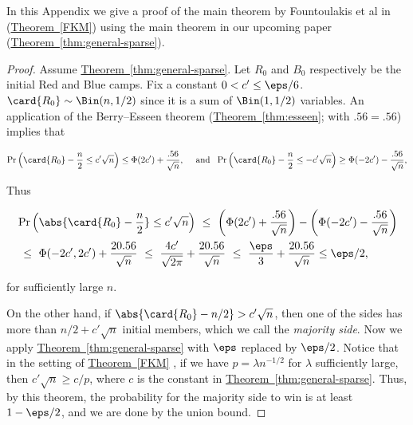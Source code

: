 \documentclass[11pt]{article}
\numberwithin{equation}{section}
\theoremstyle{definition}
\theoremstyle{plain}
\newcommand{\expref}[2]{\hyperref[#2]{#1~\ref{#2}}}
\begin{document}
			
			
			
			In this Appendix we   %
			give a proof of the main theorem by Fountoulakis et al in \cite{fountoulakis} (\expref{Theorem}{FKM}) using the main theorem in our upcoming paper (\expref{Theorem}{thm:general-sparse}).
			
			\begin{proof}
				Assume \expref{Theorem}{thm:general-sparse}. Let $R_0$ and $B_0$ respectively be the initial Red and Blue camps.
				Fix  a constant $0 < c' \le \eps/6$. $\card{R_0}\sim \Bin(n, 1/2)$ since it is a sum of $\Bin(1, 1/2)$ variables. An application of the Berry--Esseen theorem (\expref{Theorem}{thm:esseen}; with $.56 =.56$) implies that
				\begin{linenomath}\begin{equation*}
						\Pr \left(\card{R_0} - \frac{n}{2} \le c'\sqrt{n} \right) \le \Phi(2c') + \frac{.56}{\sqrt{n}},
						\quad \text{ and } \
						\Pr \left(\card{R_0} - \frac{n}{2} \le -c'\sqrt{n} \right) \ge \Phi(-2c') - \frac{.56}{\sqrt{n}},
				\end{equation*}\end{linenomath}
				Thus
				\begin{linenomath}\begin{equation*}
						\begin{aligned}
							& \Pr \left(\abs{\card{R_0} - \frac{n}{2}} \le c'\sqrt{n} \right)
							\ \le \ \left(\Phi(2c') + \frac{.56}{\sqrt{n}}\right)
							- \left(\Phi(-2c') - \frac{.56}{\sqrt{n}}\right) \\
							& \ \le \ \Phi(-2c', 2c') + \frac{20.56}{\sqrt{n}}
							\ \le \  \frac{4c'}{\sqrt{2\pi}} + \frac{20.56}{\sqrt{n}}
							\ \le \ \frac{\eps}{3} + \frac{20.56}{\sqrt{n}} \le \eps/2,
						\end{aligned}
				\end{equation*}\end{linenomath} for sufficiently large $n$.
				
				
				On the other hand, if $\abs{\card{R_0} - n/2} > c'\sqrt{n}$, then one of the sides has more than $n/2 + c' \sqrt{n}$ initial members, which we call the \emph{majority side}.
				Now we apply \expref{Theorem}{thm:general-sparse} with $\eps$ replaced by $\eps/2$.
				Notice that in the setting of \expref{Theorem}{FKM} %
				, %
				if  we have $p =\lambda n^{-1/2} $ for $\lambda$ sufficiently large, then $c' \sqrt n \ge c/ p$, where $c$ is the constant in \expref{Theorem}{thm:general-sparse}. Thus, by  this theorem,  the probability for the majority side to win is at least  $1-\eps/2$, and we are done by the union bound.
			\end{proof}
			
\end{document}
